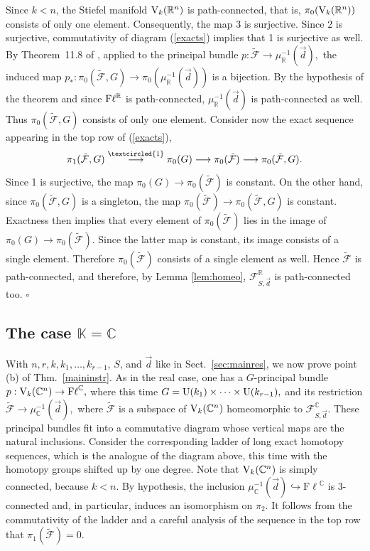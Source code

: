 \documentclass[12pt]{amsart}
\theoremstyle{definition}
\theoremstyle{remark}
\newcommand{\RR}{\mathbb R}
\newcommand{\CC}{\mathbb C}
\newcommand{\KK}{\mathbb K}
\newcommand{\Fl}{{\mathrm{F\ell}}}
\begin{document}
Since $k<n$, the Stiefel manifold ${\rm V}_k(\RR^n)$ is path-connected, that is,
$
\pi_0({\rm V}_k(\RR^n))
$ consists of only one element. 
Consequently, the map \textcircled{\small{3}} is surjective. Since \textcircled{\small{2}} is surjective, commutativity of diagram (\ref{exacts}) implies that \textcircled{\small{1}} is surjective as well.
By Theorem~11.8 of \cite{Gray}, applied to the principal bundle
$
p:\tilde{\mathcal F}\longrightarrow \mu_\RR^{-1}(\vec{d}),
$
the induced map
$
p_*:\pi_0(\tilde{\mathcal F},G)\longrightarrow \pi_0(\mu_\RR^{-1}(\vec{d}))
$
is a bijection.  By the hypothesis of the theorem and since ${\rm F}\ell^\RR$ is path-connected,  $\mu_\RR^{-1}(\vec{d})$ is path-connected as well.  Thus 
$
\pi_0(\tilde{\mathcal F},G)
$
consists of only one element.
Consider now the exact sequence appearing in the top row of (\ref{exacts}),
$$
\pi_1(\tilde{\mathcal F},G)
\stackrel{\textcircled{\small{1}}}{\longrightarrow}
\pi_0(G)
\longrightarrow
\pi_0(\tilde{\mathcal F})
\longrightarrow
\pi_0(\tilde{\mathcal F},G).
$$
Since \textcircled{\small{1}} is surjective, the map
$
\pi_0(G)\longrightarrow \pi_0(\tilde{\mathcal F})
$
is constant. On the other hand, since $\pi_0(\tilde{\mathcal F},G)$ is a singleton, the map
$
\pi_0(\tilde{\mathcal F})
\longrightarrow
\pi_0(\tilde{\mathcal F},G)
$
is constant. Exactness then implies that every element of $\pi_0(\tilde{\mathcal F})$ lies in the image of
$
\pi_0(G)\longrightarrow \pi_0(\tilde{\mathcal F}).
$
Since the latter map is constant, its image consists of a single element. Therefore $\pi_0(\tilde{\mathcal F})$ consists of a single element as well. Hence $\tilde{\mathcal F}$ is path-connected, and therefore, by Lemma \ref{lem:homeo},  ${\mathcal F}_{S, \vec{d}}^\RR$  is path-connected too. 
$\square$

\subsection{The case $\KK=\CC$}

With $n, r, k, k_1, \ldots, k_{r-1}$, $S$, and $\vec{d}$ like in Sect.~\ref{sec:mainres}, we now prove point (b) of Thm.~\ref{maininstr}.
As in the real case, one has a $G$-principal bundle
$
p:{\rm V}_k(\mathbb C^n)\to \Fl^{\mathbb C},
$ where this time
$G={\rm U}(k_1)\times\cdots\times {\rm U}(k_{r-1}),
$
and its restriction
$
\tilde{\mathcal F}\to  \mu_{\mathbb C}^{-1}(\vec d),
$
where $\tilde{\mathcal F}$ is a subspace of ${\rm V}_k(\CC^n)$ homeomorphic to ${\mathcal F}_{S, \vec{d}}^\CC$. 
These principal bundles fit into a commutative diagram whose vertical maps are the natural inclusions.
Consider the corresponding ladder of long exact homotopy sequences, which is the analogue of the diagram above, this time with the homotopy groups 
shifted up by one degree. Note that ${\rm V}_k(\mathbb C^n)$ is simply connected, because $k<n$. By hypothesis, the inclusion
$
\mu_{\mathbb C}^{-1}(\vec d)\hookrightarrow \Fl^{\mathbb C}
$
is 3-connected and, in particular, induces an isomorphism on  $\pi_2$.
It follows from the commutativity of the ladder and a careful analysis  of the  sequence in the top row that 
$
\pi_1(\tilde{\mathcal F})=0.
$
\end{document}
